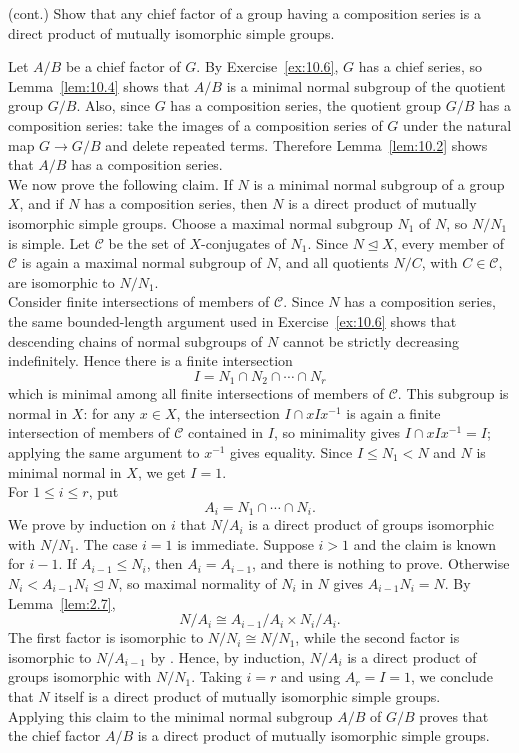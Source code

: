 \documentclass[../Odyssey_Project.tex]{subfiles}
\begin{document}
\begin{exercise}
\label{ex:10.7}
(cont.) Show that any chief factor of a group having a composition series is a direct product of mutually isomorphic simple groups.
\end{exercise}
\begin{solution}
Let $A/B$ be a chief factor of $G$. By Exercise~\ref{ex:10.6}, $G$ has a chief series, so Lemma~\ref{lem:10.4} shows that $A/B$ is a minimal normal subgroup of the quotient group $G/B$. Also, since $G$ has a composition series, the quotient group $G/B$ has a composition series: take the images of a composition series of $G$ under the natural map $G\to G/B$ and delete repeated terms. Therefore Lemma~\ref{lem:10.2} shows that $A/B$ has a composition series.\\
We now prove the following claim. If $N$ is a minimal normal subgroup of a group $X$, and if $N$ has a composition series, then $N$ is a direct product of mutually isomorphic simple groups. Choose a maximal normal subgroup $N_1$ of $N$, so $N/N_1$ is simple. Let $\mathcal{C}$ be the set of $X$-conjugates of $N_1$. Since $N\trianglelefteq X$, every member of $\mathcal{C}$ is again a maximal normal subgroup of $N$, and all quotients $N/C$, with $C\in\mathcal{C}$, are isomorphic to $N/N_1$.\\
Consider finite intersections of members of $\mathcal{C}$. Since $N$ has a composition series, the same bounded-length argument used in Exercise~\ref{ex:10.6} shows that descending chains of normal subgroups of $N$ cannot be strictly decreasing indefinitely. Hence there is a finite intersection
\[
  I=N_1\cap N_2\cap\cdots\cap N_r
\]
which is minimal among all finite intersections of members of $\mathcal{C}$. This subgroup is normal in $X$: for any $x\in X$, the intersection $I\cap xIx^{-1}$ is again a finite intersection of members of $\mathcal{C}$ contained in $I$, so minimality gives $I\cap xIx^{-1}=I$; applying the same argument to $x^{-1}$ gives equality. Since $I\leq N_1<N$ and $N$ is minimal normal in $X$, we get $I=1$.\\
For $1\leq i\leq r$, put
\[
  A_i=N_1\cap\cdots\cap N_i.
\]
We prove by induction on $i$ that $N/A_i$ is a direct product of groups isomorphic with $N/N_1$. The case $i=1$ is immediate. Suppose $i>1$ and the claim is known for $i-1$. If $A_{i-1}\leq N_i$, then $A_i=A_{i-1}$, and there is nothing to prove. Otherwise $N_i<A_{i-1}N_i\trianglelefteq N$, so maximal normality of $N_i$ in $N$ gives $A_{i-1}N_i=N$. By Lemma~\ref{lem:2.7},
\[
  N/A_i
  \cong
  A_{i-1}/A_i \times N_i/A_i.
\]
The first factor is isomorphic to $N/N_i\cong N/N_1$, while the second factor is isomorphic to $N/A_{i-1}$ by . Hence, by induction, $N/A_i$ is a direct product of groups isomorphic with $N/N_1$. Taking $i=r$ and using $A_r=I=1$, we conclude that $N$ itself is a direct product of mutually isomorphic simple groups.\\
Applying this claim to the minimal normal subgroup $A/B$ of $G/B$ proves that the chief factor $A/B$ is a direct product of mutually isomorphic simple groups.
\end{solution}
\end{document}
